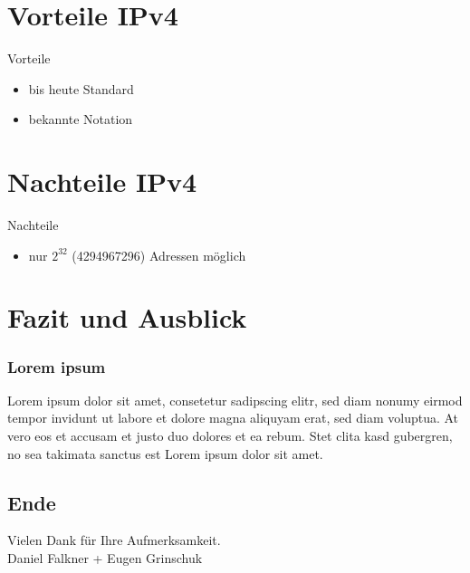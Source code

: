 \documentclass[xcolor=dvipsnames]{beamer}
\newcommand*{\Author}{Daniel Falkner + Eugen Grinschuk} %
\begin{document}

\section{Vorteile IPv4}
\begin{frame}
  \begin{block}{Vorteile}
	  \begin{itemize}
  		\item bis heute Standard
	  	\item bekannte Notation
	  \end{itemize}
  \end{block}
\end{frame}

\section{Nachteile IPv4}
\begin{frame}
  \begin{alertblock}{Nachteile}
	  \begin{itemize}
  		\item nur $2^{32}$ (4294967296) Adressen möglich
	  \end{itemize}
  \end{alertblock}
\end{frame}

\section{Fazit und Ausblick}
\begin{frame}
 \frametitle{Lorem ipsum}
  Lorem ipsum dolor sit amet, consetetur sadipscing elitr, sed diam nonumy eirmod tempor invidunt ut labore et dolore magna aliquyam erat, sed diam voluptua. At vero eos et accusam et justo duo dolores et ea rebum. Stet clita kasd gubergren, no sea takimata sanctus est Lorem ipsum dolor sit amet.
\end{frame}

\subsection*{Ende}
\begin{frame}
	\begin{block}{}	
		\begin{center}
			Vielen Dank für Ihre Aufmerksamkeit. \\
			\Author{}
		\end{center}	
	\end{block}
\end{frame}
\end{document}
